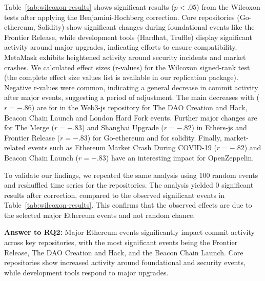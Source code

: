 Table~\ref{tab:wilcoxon-results} shows significant results ($p < .05$) from the Wilcoxon tests after applying the Benjamini-Hochberg correction. Core repositories (Go-ethereum, Solidity) show significant changes during foundational events like the Frontier Release, while development tools (Hardhat, Truffle) display significant activity around major upgrades, indicating efforts to ensure compatibility. MetaMask exhibits heightened activity around security incidents and market crashes.
We calculated effect sizes (r-values) for the Wilcoxon signed-rank test (the complete effect size values list is available in our replication package).
Negative r-values were common, indicating a general decrease in commit activity after major events, suggesting a period of adjustment. The main decreases with ($r = -.86$) are for in the Web3-js repository for The DAO Creation and Hack, Beacon Chain Launch and London Hard Fork events. Further major changes are for The Merge ($r = -.83$) and Shanghai Upgrade ($r = -.82$) in Ethers-js and Frontier Release ($r = -.83$) for Go-ethereum and for solidity. 
Finally, market-related events such as Ethereum Market Crash During COVID-19 ($r = -.82$) and Beacon Chain Launch ($r = -.83$) have an interesting impact for OpenZeppelin. 

To validate our findings, we repeated the same analysis using 100 random events and reshuffled time series for the repositories. The analysis yielded 0 significant results after correction, compared to the observed significant events in Table~\ref{tab:wilcoxon-results}. This confirms that the observed effects are due to the selected major Ethereum events and not random chance.

\begin{tcolorbox}[right=0.1cm,left=0.1cm,top=0.1cm,bottom=0.1cm]
\textbf{Answer to RQ2:} 
Major Ethereum events significantly impact commit activity across key repositories, with the most significant events being the Frontier Release, The DAO Creation and Hack, and the Beacon Chain Launch. Core repositories show increased activity around foundational and security events, while development tools respond to major upgrades. 
\end{tcolorbox}
